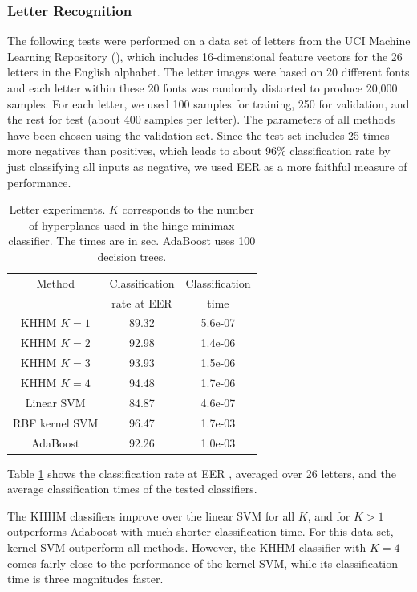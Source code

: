 \documentclass[twoside,11pt]{article}
\begin{document}
\subsubsection{Letter Recognition}
The following tests were performed  on a data set of letters  from
the UCI Machine Learning
Repository (\cite{UCIrep}), which includes 16-dimensional feature
vectors for the 26
letters in the English alphabet. The letter images were based on 20
different fonts and each letter within these 20 fonts was randomly
distorted to produce 20,000 samples. For each letter, we used
100 samples for training, 250 for validation, and the
rest for test (about 400 samples per letter). The parameters of all methods have
been chosen using the validation set. Since the test set includes 25 times
more negatives than positives, which leads to about 96\%
classification rate by just classifying all inputs as negative,
we used EER as a more faithful measure of performance.
\begin{table}[h!]
\center
\begin{tabular}{|c|c|c|}
\hline
  Method & Classification  & Classification \\
  &rate at EER& time\\
  \hline
  KHHM $K=1$  & 89.32 &  5.6e-07 \\
  KHHM $K=2$  & 92.98 &  1.4e-06\\
  KHHM $K=3$  & 93.93 &  1.5e-06\\
  KHHM $K=4$  & 94.48 &  1.7e-06\\
  Linear SVM           & 84.87 &  4.6e-07\\
  RBF kernel SVM       &96.47  &  1.7e-03\\
  AdaBoost             & 92.26 &  1.0e-03\\
\hline
\end{tabular}
\caption{Letter experiments. $K$ corresponds to the number of hyperplanes used in the hinge-minimax classifier. The times are in sec.
AdaBoost uses 100 decision trees.}\label{letters}
\end{table}
 Table \ref{letters} shows the classification rate at EER , averaged over 26
letters, and the average classification times of the
tested classifiers.

The KHHM classifiers improve over the linear SVM for all $K$, and for $K>1$
outperforms Adaboost with much shorter classification time. For this data set, kernel SVM outperform all methods. However, the KHHM classifier with $K=4$ comes fairly close to the performance of the kernel SVM, while its classification time is three magnitudes faster.
%
%
\end{document}
